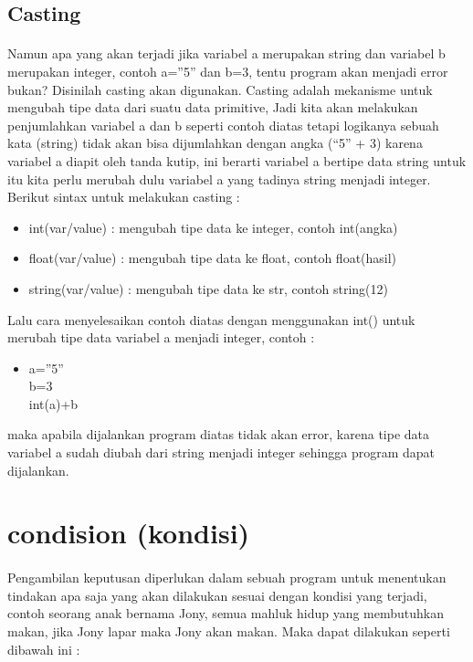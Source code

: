 \documentclass[a4paper,12pt]{report}
\begin{document}
\subsection{Casting}
\paragraph{}
Namun apa yang akan terjadi jika variabel a merupakan string dan variabel b merupakan integer, contoh a=”5” dan b=3, tentu program akan menjadi error bukan? Disinilah casting akan digunakan. Casting adalah mekanisme untuk mengubah tipe data dari suatu data primitive, Jadi kita akan melakukan penjumlahkan variabel a dan b seperti contoh diatas tetapi logikanya sebuah kata (string) tidak akan bisa dijumlahkan dengan angka (“5” + 3) karena variabel a diapit oleh tanda kutip, ini berarti variabel a bertipe data string untuk itu kita perlu merubah dulu variabel a yang tadinya string menjadi integer. Berikut sintax untuk melakukan casting :
\begin{itemize}
	\item int(var/value) : mengubah tipe data ke integer, contoh int(angka)
	\item float(var/value) : mengubah tipe data ke float, contoh float(hasil)
	\item string(var/value) : mengubah tipe data ke str, contoh string(12)
\end{itemize}
Lalu cara menyelesaikan contoh diatas dengan menggunakan int() untuk merubah tipe data variabel a menjadi integer, contoh :
\begin{itemize}

\item a=”5”\\
b=3\\
int(a)+b\\

\end{itemize}
maka apabila dijalankan program diatas tidak akan error, karena tipe data variabel a sudah diubah dari string menjadi integer sehingga program dapat dijalankan.

\section{condision (kondisi)}
\paragraph{}
Pengambilan keputusan diperlukan dalam sebuah program untuk menentukan tindakan apa saja yang akan dilakukan sesuai dengan kondisi yang terjadi, contoh seorang anak bernama Jony, semua mahluk hidup yang membutuhkan makan, jika Jony lapar maka Jony akan makan. Maka dapat dilakukan seperti dibawah ini :\\
\end{document}
